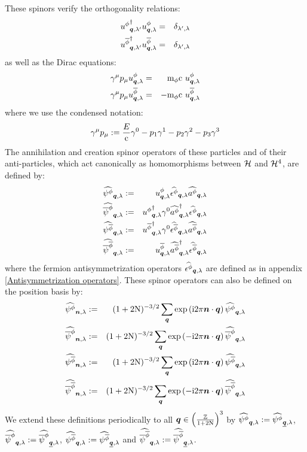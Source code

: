 \documentclass[10pt,a4paper,twoside,openany]{book}
\begin{document}
These spinors verify the orthogonality relations:
\begin{eqnarray*}
\ddirspin \pt \q {\sp'} \dirspin \pt \q \sp & = & \delta_{\sp',\sp} \\
\ddirspin {\antiparticle \pt} \q {\sp'} \dirspin {\antiparticle \pt} \q \sp & = & \delta_{\sp',\sp}
\end{eqnarray*}
as well as the Dirac equations:
\begin{eqnarray*}
\gammat \mu \stvl p \mu \dirspin \pt \q \sp & = & \mp \pt \c\ \dirspin \pt \q \sp \\
\gammat \mu \stvl p \mu \dirspin {\antiparticle \pt} \q \sp & = & - \mp \pt \c\ \dirspin {\antiparticle \pt} \q \sp
\end{eqnarray*}
where we use the condensed notation:
\begin{equation*}
\gammat \mu \stvl p \mu \eqdef \frac E \c \gammat 0 - p_1 \gammat 1 - p_2 \gammat 2 - p_3 \gammat 3
\end{equation*}
The annihilation and creation spinor operators of these particles and of their anti-particles, which act canonically as homomorphisms between $\H$ and $\H^4$, are defined by:
\begin{eqnarray*}
\SAop \pt \q \sp & \eqdef & \dirspin \pt \q \sp \Faop \pt \q \sp \aop \pt \q \sp \\
\SCop \pt \q \sp & \eqdef & \ddirspin \pt \q \sp \gammat 0 \cop \pt \q \sp \Faop \pt \q \sp \\
\SAop {\antiparticle \pt} \q \sp & \eqdef & \ddirspin {\antiparticle \pt} \q \sp \gammat 0 \Faop {\antiparticle \pt} \q \sp \aop {\antiparticle \pt} \q \sp \\
\SCop {\antiparticle \pt} \q \sp & \eqdef & \dirspin {\antiparticle \pt} \q \sp \cop {\antiparticle \pt} \q \sp \Faop {\antiparticle \pt} \q \sp
\end{eqnarray*}
where the fermion antisymmetrization operators $\Faop \pt \q \sp$ are defined as in appendix \ref{Antisymmetrization operators}. These spinor operators can also be defined on the position basis by:
\begin{eqnarray*}
\SAop \pt \n \sp & \eqdef & ( 1+2\N )^{-3/2} \sum_{\q} \exp{\i 2 \pi \n \ssp \q} \SAop \pt \q \sp \\
\SCop \pt \n \sp & \eqdef & ( 1+2\N )^{-3/2} \sum_{\q} \exp{-\i 2 \pi \n \ssp \q} \SCop \pt \q \sp \\
\SAop {\antiparticle \pt} \n \sp & \eqdef & ( 1+2\N )^{-3/2} \sum_{\q} \exp{\i 2 \pi \n \ssp \q} \SAop {\antiparticle \pt} \q \sp \\
\SCop {\antiparticle \pt} \n \sp & \eqdef & ( 1+2\N )^{-3/2} \sum_{\q} \exp{-\i 2 \pi \n \ssp \q} \SCop {\antiparticle \pt} \q \sp
\end{eqnarray*}
We extend these definitions periodically to all $\q \in \ILD$ by $\SAop \pt \q \sp \eqdef \SAop \pt {\eqp \q} \sp$, $\SCop \pt \q \sp \eqdef \SCop \pt {\eqp \q} \sp$, $\SAop {\antiparticle \pt} \q \sp \eqdef \SAop {\antiparticle \pt} {\eqp \q} \sp$ and $\SCop {\antiparticle \pt} \q \sp \eqdef \SCop {\antiparticle \pt} {\eqp \q} \sp$.
\end{document}
